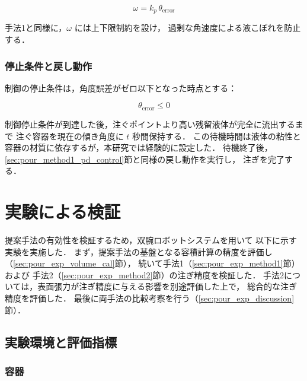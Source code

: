 \begin{equation}
  \omega = k_p\,\theta_{\mathrm{error}}
  \label{eq:pour_p_control}
\end{equation}

手法1と同様に，$\omega$ には上下限制約を設け，
過剰な角速度による液こぼれを防止する．

\subsubsection{停止条件と戻し動作}

制御の停止条件は，角度誤差がゼロ以下となった時点とする：

\begin{equation}
  \theta_{\mathrm{error}} \leq 0
  \label{eq:pour_theta_stop}
\end{equation}

制御停止条件が到達した後，注ぐポイントより高い残留液体が完全に流出するまで
注ぐ容器を現在の傾き角度に $t$ 秒間保持する．
この待機時間は液体の粘性と容器の材質に依存するが，本研究では経験的に設定した．
待機終了後，\ref{sec:pour_method1_pd_control}節と同様の戻し動作を実行し，
注ぎを完了する．


\section{実験による検証}
\label{sec:pour_experiment}

提案手法の有効性を検証するため，双腕ロボットシステムを用いて
以下に示す実験を実施した．
まず，提案手法の基盤となる容積計算の精度を評価し（\ref{sec:pour_exp_volume_cal}節），
続いて手法1（\ref{sec:pour_exp_method1}節）および
手法2（\ref{sec:pour_exp_method2}節）の注ぎ精度を検証した．
手法2については，表面張力が注ぎ精度に与える影響を別途評価した上で，
総合的な注ぎ精度を評価した．
最後に両手法の比較考察を行う（\ref{sec:pour_exp_discussion}節）．

\subsection{実験環境と評価指標}
\label{sec:pour_exp_setup}

\subsubsection{容器}


